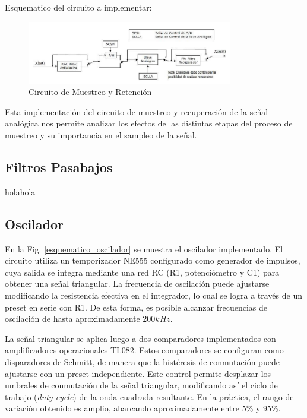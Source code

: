 Esquematico del circuito a implementar:
\begin{figure}[H]
    \centering
    \includegraphics[width=0.8\textwidth]{Imagenes/Circuito_Muestreo.png}
    \caption{Circuito de Muestreo y Retención}
    \label{fig:Circuito_Muestreo}
\end{figure}
Esta implementación del circuito de muestreo y recuperación de la señal analógica nos permite analizar 
los efectos de las distintas etapas del proceso de muestreo y su importancia en el sampleo de la señal.
\subsection{Filtros Pasabajos}
holahola

\subsection{Oscilador}
En la Fig. \ref{esquematico_oscilador} se muestra el oscilador implementado. El circuito utiliza un temporizador NE555 configurado como generador de impulsos, cuya salida se integra mediante una red RC (R1, potenciómetro y C1) para obtener una señal triangular. La frecuencia de oscilación puede ajustarse modificando la resistencia efectiva en el integrador, lo cual se logra a través de un preset en serie con R1. De esta forma, es posible alcanzar frecuencias de oscilación de hasta aproximadamente $200kHz$.

La señal triangular se aplica luego a dos comparadores implementados con amplificadores operacionales TL082. Estos comparadores se configuran como disparadores de Schmitt, de manera que la histéresis de conmutación puede ajustarse con un preset independiente. Este control permite desplazar los umbrales de conmutación de la señal triangular, modificando así el ciclo de trabajo (\textit{duty cycle}) de la onda cuadrada resultante. En la práctica, el rango de variación obtenido es amplio, abarcando aproximadamente entre 5\% y 95\%.

